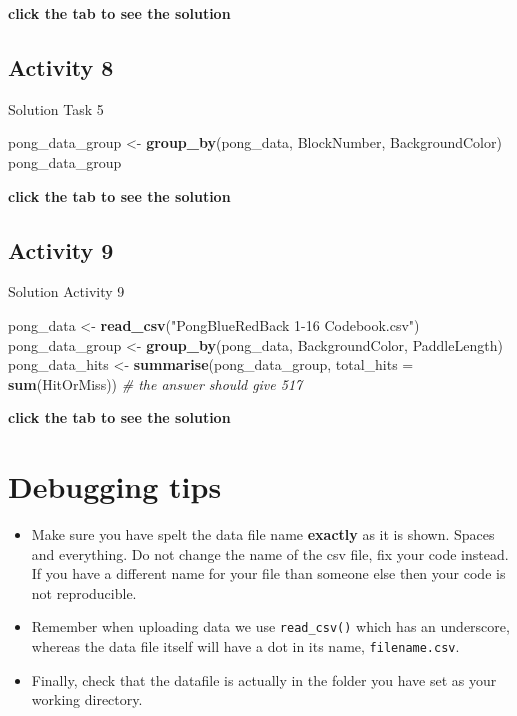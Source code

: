 \documentclass[]{book}
\newenvironment{Shaded}{\begin{snugshade}}{\end{snugshade}}
\newcommand{\CommentTok}[1]{\textcolor[rgb]{0.56,0.35,0.01}{\textit{#1}}}
\newcommand{\DataTypeTok}[1]{\textcolor[rgb]{0.13,0.29,0.53}{#1}}
\newcommand{\KeywordTok}[1]{\textcolor[rgb]{0.13,0.29,0.53}{\textbf{#1}}}
\newcommand{\NormalTok}[1]{#1}
\newcommand{\StringTok}[1]{\textcolor[rgb]{0.31,0.60,0.02}{#1}}
\providecommand{\tightlist}{%
  \setlength{\itemsep}{0pt}\setlength{\parskip}{0pt}}
\begin{document}
\textbf{click the tab to see the solution}

\hypertarget{activity-8}{%
\subsection{Activity 8}\label{activity-8}}

Solution Task 5

\begin{Shaded}
\begin{Highlighting}[]
\NormalTok{pong_data_group <-}\StringTok{ }\KeywordTok{group_by}\NormalTok{(pong_data, BlockNumber, BackgroundColor)}
\NormalTok{pong_data_group}
\end{Highlighting}
\end{Shaded}

\textbf{click the tab to see the solution}

\hypertarget{activity-9}{%
\subsection{Activity 9}\label{activity-9}}

Solution Activity 9

\begin{Shaded}
\begin{Highlighting}[]
\NormalTok{pong_data <-}\StringTok{ }\KeywordTok{read_csv}\NormalTok{(}\StringTok{"PongBlueRedBack 1-16 Codebook.csv"}\NormalTok{)}
\NormalTok{pong_data_group <-}\StringTok{ }\KeywordTok{group_by}\NormalTok{(pong_data, BackgroundColor, PaddleLength)}
\NormalTok{pong_data_hits <-}\StringTok{ }\KeywordTok{summarise}\NormalTok{(pong_data_group, }\DataTypeTok{total_hits =} \KeywordTok{sum}\NormalTok{(HitOrMiss))}
\CommentTok{# the answer should give 517}
\end{Highlighting}
\end{Shaded}

\textbf{click the tab to see the solution}

\hypertarget{debugging-tips-2}{%
\section{Debugging tips}\label{debugging-tips-2}}

\begin{itemize}
\tightlist
\item
  Make sure you have spelt the data file name \textbf{exactly} as it is shown. Spaces and everything. Do not change the name of the csv file, fix your code instead. If you have a different name for your file than someone else then your code is not reproducible.
\item
  Remember when uploading data we use \texttt{read\_csv()} which has an underscore, whereas the data file itself will have a dot in its name, \texttt{filename.csv}.
\item
  Finally, check that the datafile is actually in the folder you have set as your working directory.
\end{itemize}
\end{document}
